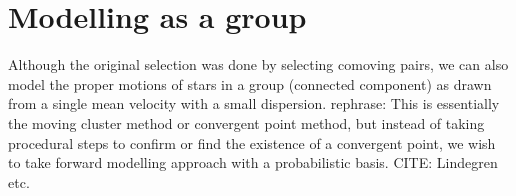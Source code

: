 \documentclass[modern,letterpaper]{aastex61}
\newcommand{\todo}[1]{{\color{crimson}#1}}
\begin{document}





\section{Modelling as a group}

Although the original selection was done by selecting comoving pairs, we can
also model the proper motions of stars in a group (connected component) as drawn
from a single mean velocity with a small dispersion.
\todo{rephrase:
This is essentially the moving cluster method or convergent point method,
but instead of taking procedural steps to confirm or find the existence of a
convergent point, we wish to take forward modelling approach with a probabilistic basis.}
\todo{CITE: Lindegren etc.}
\end{document}
